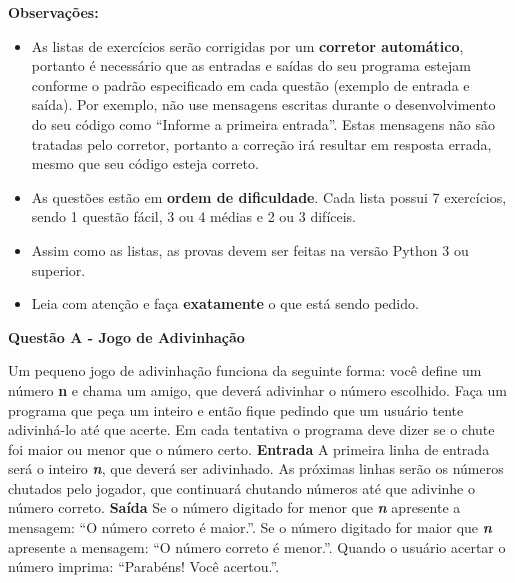 \documentclass[a4paper, 12pt]{article}
\begin{document}
\textbf{{\large Observações:}}
\begin{itemize}
	\item As listas de exercícios serão corrigidas por um \textbf{corretor automático}, portanto é necessário que as entradas e saídas do seu programa estejam conforme o padrão especificado em cada questão (exemplo de entrada e saída). Por exemplo, não use mensagens escritas durante o desenvolvimento do seu código como “Informe a primeira entrada”. Estas mensagens não são tratadas pelo corretor, portanto a correção irá resultar em resposta errada, mesmo que seu código esteja correto.
	\item As questões estão em \textbf{ordem de dificuldade}. Cada lista possui 7 exercícios, sendo 1 questão fácil, 3 ou 4 médias e 2 ou 3 difíceis.
	\item Assim como as listas, as provas devem ser feitas na versão Python 3 ou superior.
	\item Leia com atenção e faça \textbf{exatamente} o que está sendo pedido.
\end{itemize}
\newpage %
\begin{center}
\textbf{{\Large Questão A - Jogo de Adivinhação}}
\end{center}
\vspace{5pt}
Um pequeno jogo de adivinhação funciona da seguinte forma: você define um número \textbf{n} e chama um amigo, que deverá adivinhar o número escolhido. Faça um programa que peça um inteiro e então fique pedindo que um usuário tente adivinhá-lo até que acerte. Em cada tentativa o programa deve dizer se o chute foi maior ou menor que o número certo.
\newline \newline
\textbf{{\large Entrada}} \newline
A primeira linha de entrada será o inteiro \textbf{\textit{n}}, que deverá ser adivinhado. As próximas linhas serão os números chutados pelo jogador, que continuará chutando números até que adivinhe o número correto.
\newline \newline
\textbf{{\large Saída}} \newline
Se o número digitado for menor que \textbf{\textit{n}} apresente a mensagem: ``O número correto é maior.''. Se o número digitado for maior que \textbf{\textit{n}} apresente a mensagem: ``O número correto é menor.''. Quando o usuário acertar o número imprima: ``Parabéns! Você acertou.''.
\newline
\end{document}
